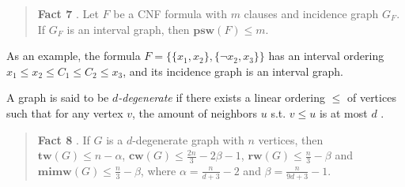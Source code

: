 \documentclass{article}
\begin{document}
\begin{quote}
	\textbf{Fact 7} \cite{DBLP:conf/sat/SaetherTV14}.
	Let $F$ be a CNF formula with $m$ clauses and incidence graph $G_F$.
	If $G_F$ is an interval graph, then $\mathbf{psw}(F) \leq m$.
\end{quote}

\noindent
As an example, the formula $F=\{ \{x_1, x_2\}, \{\neg x_2, x_3\} \}$ has an interval ordering $x_1 \leq x_2 \leq C_1 \leq C_2 \leq x_3$, and its incidence graph is an interval graph.

A graph is said to be {\em $d$-degenerate} if there exists a linear ordering $\leq$ of vertices such that for any vertex $v$, the amount of neighbors $u$ s.t. $v \leq u$ is at most $d$ \cite{PHD:vatshelle}.

\begin{quote}
	\textbf{Fact 8} \cite{PHD:vatshelle}. If $G$ is a $d$-degenerate graph with $n$ vertices, then $\mathbf{tw}(G) \leq n - \alpha$, $\mathbf{cw}(G) \leq \frac{2n}{3} - 2\beta - 1$, $\mathbf{rw}(G) \leq \frac{n}{3} - \beta$ and $\mathbf{mimw}(G) \leq \frac{n}{3} - \beta$, where $\alpha = \frac{n}{d + 3} - 2$ and $\beta = \frac{n}{9d+3} - 1$.
\end{quote}




\end{document}
